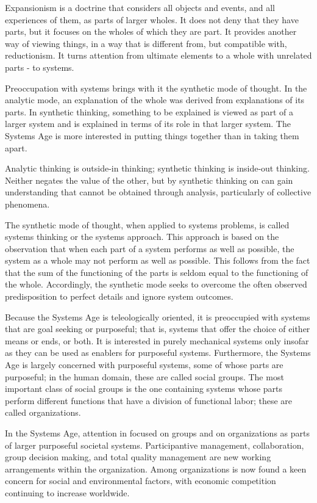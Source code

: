 Expansionism is a doctrine that considers all objects and events, and all experiences of them, as parts of larger wholes. It does not deny that they have parts, but it focuses on the wholes of which they are part. It provides another way of viewing things, in a way that is different from, but compatible with, reductionism. It turns attention from ultimate elements to a whole with unrelated parts - to systems.

Preoccupation with systems brings with it the synthetic mode of thought. In the analytic mode, an explanation of the whole was derived from explanations of its parts. In synthetic thinking, something to be explained is viewed as part of a larger system and is explained in terms of its role in that larger system. The Systems Age is more interested in putting things together than in taking them apart.

Analytic thinking is outside-in thinking; synthetic thinking is inside-out thinking. Neither negates the value of the other, but by synthetic thinking on can gain understanding that cannot be obtained through analysis, particularly of collective phenomena.

The synthetic mode of thought, when applied to systems problems, is called systems thinking or the systems approach. This approach is based on the observation that when each part of a system performs as well as possible, the system as a whole may not perform as well as possible. This follows from the fact that the sum of the functioning of the parts is seldom equal to the functioning of the whole. Accordingly, the synthetic mode seeks to overcome the often observed predisposition to perfect details and ignore system outcomes.

Because the Systems Age is teleologically oriented, it is preoccupied with systems that are goal seeking or purposeful; that is, systems that offer the choice of either means or ends, or both. It is interested in purely mechanical systems only insofar as they can be used as enablers for purposeful systems. Furthermore, the Systems Age is largely concerned with purposeful systems, some of whose parts are purposeful; in the human domain, these are called social groups. The most important class of social groups is the one containing systems whose parts perform different functions that have a division of functional labor; these are called organizations.

In the Systems Age, attention in focused on groups and on organizations as parts of larger purposeful societal systems. Participantive management, collaboration, group decision making, and total quality management are new working arrangements within the organization. Among organizations is now found a keen concern for social and environmental factors, with economic competition continuing to increase worldwide.

